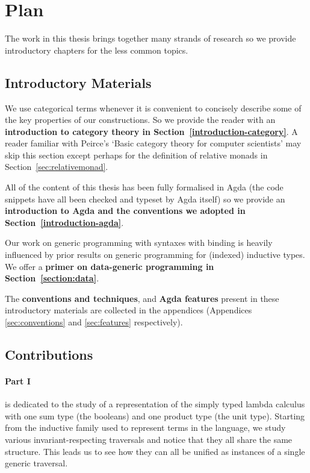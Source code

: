 \section{Plan}

The work in this thesis brings together many strands of research so we provide
introductory chapters for the less common topics.

\subsection{Introductory Materials}

We use categorical terms whenever it is convenient to concisely describe some
of the key properties of our constructions. So we provide the reader with an
\textbf{introduction to category theory in Section~\ref{introduction-category}}.
A reader familiar with Peirce's `Basic category theory for computer scientists'
may skip this section except perhaps for the definition of relative monads
in Section~\ref{sec:relativemonad}.


All of the content of this thesis has been fully formalised in Agda
(the code snippets have all been checked and typeset by Agda itself)
so we provide an \textbf{introduction to Agda and the conventions we
adopted in Section~\ref{introduction-agda}}.

Our work on generic programming with syntaxes with binding is heavily influenced
by prior results on generic programming for (indexed) inductive types. We offer
a \textbf{primer on data-generic programming in Section~\ref{section:data}}.

The \textbf{conventions and techniques}, and \textbf{Agda features} present
in these introductory materials are collected in the appendices
(Appendices \ref{sec:conventions} and \ref{sec:features} respectively).

\subsection{Contributions}

\paragraph{Part I} is dedicated to the study of a \scopeandtypesafe{}
representation of the simply typed lambda calculus with one sum type
(the booleans) and one product type (the unit type).
%
Starting from the inductive family used to represent terms in the language,
we study various invariant-respecting traversals and notice that they all
share the same structure. This leads us to see how they can all be unified
as instances of a single generic traversal.

